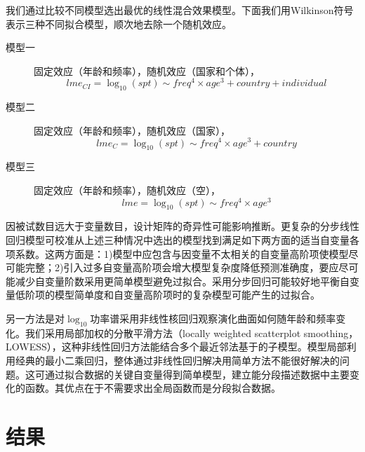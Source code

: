 我们通过比较不同模型选出最优的线性混合效果模型。下面我们用Wilkinson符号表示三种不同拟合模型，顺次地去除一个随机效应。
\begin{description}
	\item[模型一] 固定效应（年龄和频率），随机效应（国家和个体），\[lme_{CI}=\log_{10}(spt)\sim{freq^4\times{age^3}+country+individual}\]
	\item[模型二] 固定效应（年龄和频率），随机效应（国家），\[lme_{C}=\log_{10}(spt)\sim{freq^4\times{age^3}+country}\]
	\item[模型三] 固定效应（年龄和频率），随机效应（空），\[lme=\log_{10}(spt)\sim{freq^4\times{age^3}}\]
\end{description}

因被试数目远大于变量数目，设计矩阵的奇异性可能影响推断。更复杂的分步线性回归模型可校准从上述三种情况中选出的模型找到满足如下两方面的适当自变量各项系数。这两方面是：1)模型中应包含与因变量不太相关的自变量高阶项使模型尽可能完整；2)引入过多自变量高阶项会增大模型复杂度降低预测准确度，要应尽可能减少自变量阶数采用更简单模型避免过拟合。采用分步回归可能较好地平衡自变量低阶项的模型简单度和自变量高阶项时的复杂模型可能产生的过拟合。

另一方法是对$\log_{10}$功率谱采用非线性核回归观察演化曲面如何随年龄和频率变化。我们采用局部加权的分散平滑方法（locally weighted scatterplot smoothing，LOWESS），这种非线性回归方法能结合多个最近邻法基于的子模型。模型局部利用经典的最小二乘回归，整体通过非线性回归解决用简单方法不能很好解决的问题。这可通过拟合数据的关键自变量得到简单模型，建立能分段描述数据中主要变化的函数。其优点在于不需要求出全局函数而是分段拟合数据。

\section{结果}
